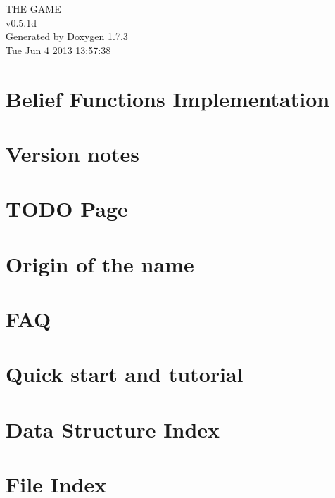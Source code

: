 \documentclass[a4paper]{book}
\begin{document}
\hypersetup{pageanchor=false}
\begin{titlepage}
\vspace*{7cm}
\begin{center}
{\Large THE GAME \\[1ex]\large v0.5.1d }\\
\vspace*{1cm}
{\large Generated by Doxygen 1.7.3}\\
\vspace*{0.5cm}
{\small Tue Jun 4 2013 13:57:38}\\
\end{center}
\end{titlepage}
\clearemptydoublepage
{}
\tableofcontents
\clearemptydoublepage
{}
\hypersetup{pageanchor=true}
\chapter{Belief Functions Implementation}
\label{index}\hypertarget{index}{}
\chapter{Version notes}
\label{version_sec}
\hypertarget{version_sec}{}

\chapter{TODO Page}
\label{TODO}
\hypertarget{TODO}{}

\chapter{Origin of the name}
\label{origin_page}
\hypertarget{origin_page}{}

\chapter{FAQ}
\label{FAQ_page}
\hypertarget{FAQ_page}{}

\chapter{Quick start and tutorial}
\label{Tuto_page}
\hypertarget{Tuto_page}{}

\chapter{Data Structure Index}

\chapter{File Index}

\end{document}
